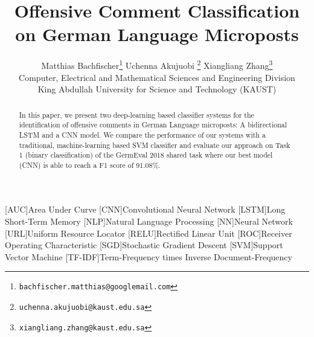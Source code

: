 \documentclass[11pt]{article}
\title{Offensive Comment Classification on German Language Microposts}
\author{Matthias Bachfischer\thanks{\tt \space bachfischer.matthias@googlemail.com} \qquad Uchenna Akujuobi \thanks{\tt  \space uchenna.akujuobi@kaust.edu.sa} \qquad Xiangliang Zhang\thanks{\tt  \space xiangliang.zhang@kaust.edu.sa} \\
   Computer, Electrical and Mathematical Sciences and Engineering Division \\
     King Abdullah University for Science and Technology (KAUST) \\
}
\date{}
\begin{document}
\begin{acronym}[\hspace{1.8cm}]
[AUC]{Area Under Curve}
[CNN]{Convolutional Neural Network}
[LSTM]{Long Short-Term Memory}
 [NLP]{Natural Language Processing}
 [NN]{Neural Network}
 [URL]{Uniform Resource Locator}
 [RELU]{Rectified Linear Unit}
 [ROC]{Receiver Operating Characteristic}
 [SGD]{Stochastic Gradient Descent}
[SVM]{Support Vector Machine}
[TF-IDF]{Term-Frequency times Inverse Document-Frequency}

\end{acronym}

\maketitle
\begin{abstract}
In this paper, we present two deep-learning based classifier systems for the identification of offensive comments in German Language microposts: A bidirectional LSTM and a CNN model. We compare the performance of our systems with a traditional, machine-learning based SVM classifier and evaluate our approach on Task 1 (binary classification) of the GermEval 2018 shared task where our best model (CNN) is able to reach a F1 score of 91.08\%.
\end{abstract}

\nocite{RN65}
\end{document}
